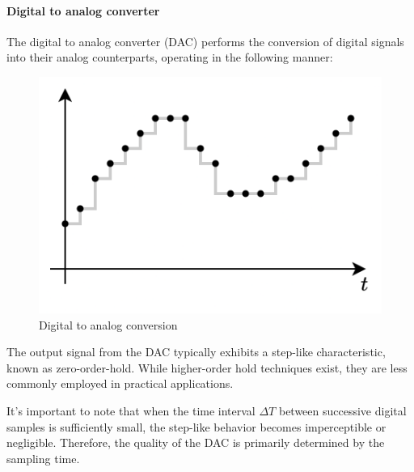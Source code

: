 \paragraph*{Digital to analog converter}
The digital to analog converter (DAC) performs the conversion of digital signals into their analog counterparts, operating in the following manner:
\begin{figure}[H]
    \centering
    \includegraphics[width=0.5\linewidth]{images/discret2.png}
    \caption{Digital to analog conversion}
\end{figure}
The output signal from the DAC typically exhibits a step-like characteristic, known as zero-order-hold.
While higher-order hold techniques exist, they are less commonly employed in practical applications.

It's important to note that when the time interval $\Delta T$ between successive digital samples is sufficiently small, the step-like behavior becomes imperceptible or negligible.
Therefore, the quality of the DAC is primarily determined by the sampling time.